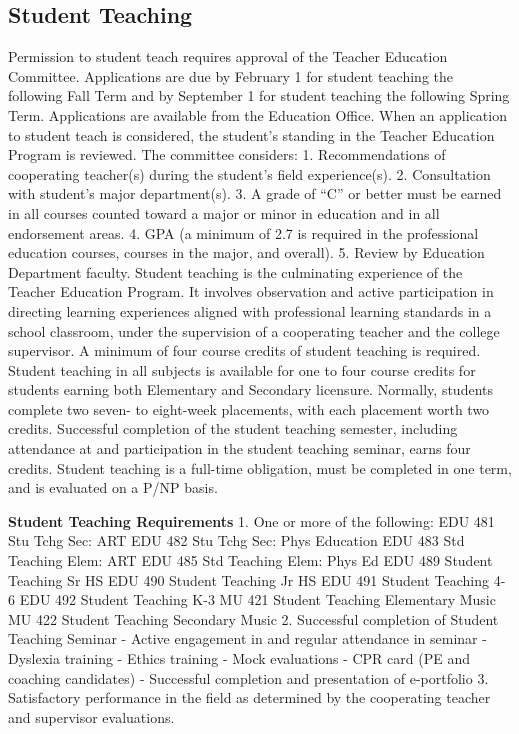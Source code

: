 \documentclass[
  letterpaper,
]{scrbook}
\begin{document}
\subsection{Student Teaching}\label{student-teaching}

Permission to student teach requires approval of the Teacher Education
Committee. Applications are due by February 1 for student teaching the
following Fall Term and by September 1 for student teaching the
following Spring Term. Applications are available from the Education
Office. When an application to student teach is considered, the
student's standing in the Teacher Education Program is reviewed. The
committee considers: 1. Recommendations of cooperating teacher(s) during
the student's field experience(s). 2. Consultation with student's major
department(s). 3. A grade of ``C'' or better must be earned in all
courses counted toward a major or minor in education and in all
endorsement areas. 4. GPA (a minimum of 2.7 is required in the
professional education courses, courses in the major, and overall). 5.
Review by Education Department faculty. Student teaching is the
culminating experience of the Teacher Education Program. It involves
observation and active participation in directing learning experiences
aligned with professional learning standards in a school classroom,
under the supervision of a cooperating teacher and the college
supervisor. A minimum of four course credits of student teaching is
required. Student teaching in all subjects is available for one to four
course credits for students earning both Elementary and Secondary
licensure. Normally, students complete two seven- to eight-week
placements, with each placement worth two credits. Successful completion
of the student teaching semester, including attendance at and
participation in the student teaching seminar, earns four credits.
Student teaching is a full-time obligation, must be completed in one
term, and is evaluated on a P/NP basis.

\textbf{Student Teaching Requirements} 1. One or more of the following:
EDU 481 Stu Tchg Sec: ART EDU 482 Stu Tchg Sec: Phys Education EDU 483
Std Teaching Elem: ART EDU 485 Std Teaching Elem: Phys Ed EDU 489
Student Teaching Sr HS EDU 490 Student Teaching Jr HS EDU 491 Student
Teaching 4-6 EDU 492 Student Teaching K-3 MU 421 Student Teaching
Elementary Music MU 422 Student Teaching Secondary Music 2. Successful
completion of Student Teaching Seminar - Active engagement in and
regular attendance in seminar - Dyslexia training - Ethics training -
Mock evaluations - CPR card (PE and coaching candidates) - Successful
completion and presentation of e-portfolio 3. Satisfactory performance
in the field as determined by the cooperating teacher and supervisor
evaluations.
\end{document}
